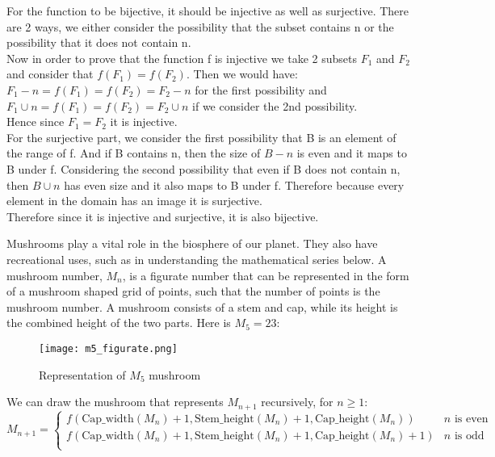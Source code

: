 \documentclass[addpoints]{exam}
\begin{document}
\begin{questions}
  \begin{solution}
    For the function to be bijective, it should be injective as well as surjective. There are 2 ways, we either consider the possibility that the subset contains n or the possibility that it does not contain n.\\
    Now in order to prove that the function f is injective we take 2 subsets $F_1$ and $F_2$ and consider that $f(F_1) = f(F_2)$. Then we would have:\\
   $ F_1 - {n} = f(F_1) = f(F_2) = F_2 - {n}$ for the first possibility and\\
    $F_1 \cup {n} = f(F_1) = f(F_2) = F_2 \cup {n}$ if we consider the 2nd possibility. \\
    Hence since $F_1 = F_2$ it is injective. \\
    For the surjective part,  we consider the first possibility that B is an element of the range of f. And if B contains n, then the size of $B−{n}$ is even and it maps to B under f. Considering the second possibility that even if B does not contain n, then $B\cup{n}$ has even size and it also maps to B under f. Therefore because every element in the domain has an image it is surjective.\\
    Therefore since it is injective and surjective, it is also bijective.
  \end{solution}
  
\question Mushrooms play a vital role in the biosphere of our planet. They also have recreational uses, such as in understanding the mathematical series below. A mushroom number, $M_n$, is a figurate number that can be represented in the form of a mushroom shaped grid of points, such that the number of points is the mushroom number. A mushroom consists of a stem and cap, while its height is the combined height of the two parts. Here is $M_5=23$:

\begin{figure}[h]
  \centering
  \texttt{[image: m5\_figurate.png]}
  \caption{Representation of $M_5$ mushroom}
  \label{fig:mushroom_anatomy}
\end{figure}

We can draw the mushroom that represents $M_{n+1}$ recursively, for $n \geq 1$:
\[ 
    M_{n+1}=
    \begin{cases} 
      f(\textrm{Cap\_width}(M_n) + 1, \textrm{Stem\_height}(M_n) + 1, \textrm{Cap\_height}(M_n))  & n \textrm{ is even} \\
      f(\textrm{Cap\_width}(M_n) + 1, \textrm{Stem\_height}(M_n) + 1, \textrm{Cap\_height}(M_n)+1) & n \textrm{ is odd}  \\      
   \end{cases}
\]


\end{questions}
\end{document}
